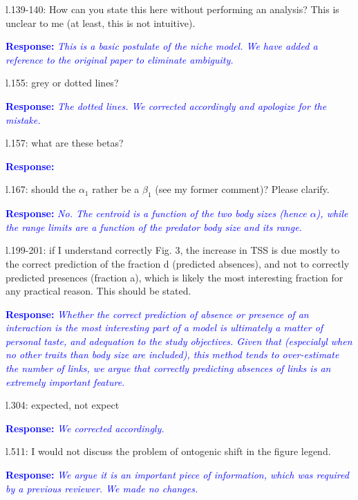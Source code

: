 \documentclass [12pt,onecolumn,twoside,openright]{report}
\begin{document}
\begin{onehalfspacing}
\medskip l.139-140: How can you state this here without
performing an analysis? This is unclear to me (at least, this is not intuitive).


\textcolor{blue}{\textbf{Response:}} \textit{\textcolor{blue}{This is a basic
postulate of the niche model. We have added a reference to the original paper to
eliminate ambiguity.}}

\medskip l.155: grey or dotted lines?

\textcolor{blue}{\textbf{Response:}} \textit{\textcolor{blue}{The
  \emph{dotted} lines. We corrected accordingly and apologize for the mistake.}}

\medskip l.157: what are these betas?

\textcolor{blue}{\textbf{Response:}} \textit{\textcolor{blue}{}}

\medskip l.167: should the $\alpha_1$ rather be a $\beta_1$
(see my former comment)? Please clarify.


\textcolor{blue}{\textbf{Response:}} \textit{\textcolor{blue}{No. The centroid
is a function of the two body sizes (hence $\alpha$), while the range limits are
a function of the predator body size and its range.}}

\medskip l.199-201: if I understand correctly Fig. 3, the
increase in TSS is due mostly to the correct prediction of the fraction d
(predicted absences), and not to correctly predicted presences (fraction a),
which is likely the most interesting fraction for any practical reason. This
should be stated.

\textcolor{blue}{\textbf{Response:}} \textit{\textcolor{blue}{Whether the
correct prediction of absence or presence of an interaction is the most
interesting part of a model is ultimately a matter of personal taste, and
adequation to the study objectives. Given that (especialyl when no other traits
than body size are included), this method tends to over-estimate the number of
links, we argue that correctly predicting absences of links is an extremely
important feature.}}

\medskip l.304: expected, not expect

\textcolor{blue}{\textbf{Response:}} \textit{\textcolor{blue}{We corrected
accordingly.}}

\medskip l.511: I would not discuss the problem of ontogenic
shift in the figure legend.

\textcolor{blue}{\textbf{Response:}} \textit{\textcolor{blue}{We argue it is an
important piece of information, which was required by a previous reviewer. We
made no changes.}}


\end{onehalfspacing}
\end{document}
